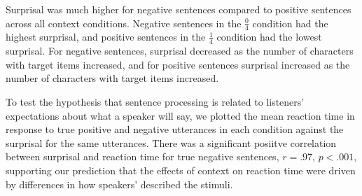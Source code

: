 \documentclass[man]{apa2}
\begin{document}
Surprisal was much higher for negative sentences compared to positive sentences across all context conditions.  Negative sentences in the $\frac{0}{4}$ condition had the highest surprisal, and positive sentences in the $\frac{1}{4}$ condition had the lowest surprisal.  For negative sentences, surprisal decreased as the number of characters with target items increased, and for positive sentences surprisal increased as the number of characters with target items increased.  

To test the hypothesis that sentence processing is related to listeners' expectations about what a speaker will say, we plotted the mean reaction time in response to true positive and negative utterances in each condition against the surprisal for the same utterances.  There was a significant posiitve correlation between surprisal and reaction time for true negative sentences, $r=.97$, $p<.001$, supporting our prediction that the effects of context on reaction time were driven by differences in how speakers' described the stimuli.  





\end{document}

